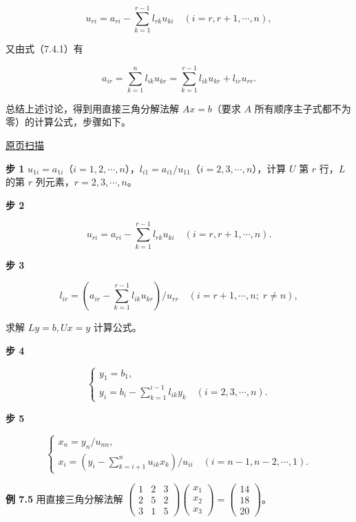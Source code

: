 \documentclass[
  10pt,
  fontset=fandol]{ctexart}
\begin{document}
\[u_{ri}=a_{ri}-\sum_{k=1}^{r-1}l_{rk}u_{ki}\quad(i=r,r+1,\cdots,n),\]

又由式（7.4.1）有

\[a_{ir}=\sum_{k=1}^{n}l_{ik}u_{kr}=\sum_{k=1}^{r-1}l_{ik}u_{kr}+l_{ir}u_{rr}.\]

总结上述讨论，得到用直接三角分解法解 \(Ax=b\)（要求 \(A\) 所有顺序主子式都不为零）的计算公式，步骤如下。

\href{../../source-images/pdf-192.jpeg}{原页扫描}

\textbf{步 1} \(u_{1i}=a_{1i}\)（\(i=1,2,\cdots,n\)），\(l_{i1}=a_{i1}/u_{11}\)（\(i=2,3,\cdots,n\)），计算 \(U\) 第 \(r\) 行，\(L\) 的第 \(r\) 列元素，\(r=2,3,\cdots,n\)。

\textbf{步 2}

\[u_{ri}=a_{ri}-\sum_{k=1}^{r-1}l_{rk}u_{ki}\quad(i=r,r+1,\cdots,n).\tag{7.4.2}\]

\textbf{步 3}

\[l_{ir}=\left(a_{ir}-\sum_{k=1}^{r-1}l_{ik}u_{kr}\right)/u_{rr}\quad(i=r+1,\cdots,n;\;r\ne n),\tag{7.4.3}\]

求解 \(Ly=b,Ux=y\) 计算公式。

\textbf{步 4}

\[
\begin{cases}
y_1=b_1,\\
y_i=\displaystyle b_i-\sum_{k=1}^{i-1}l_{ik}y_k\quad(i=2,3,\cdots,n).
\end{cases}
\tag{7.4.4}
\]

\textbf{步 5}

\[
\begin{cases}
x_n=y_n/u_{nn},\\
x_i=\displaystyle\left(y_i-\sum_{k=i+1}^{n}u_{ik}x_k\right)/u_{ii}\quad(i=n-1,n-2,\cdots,1).
\end{cases}
\tag{7.4.5}
\]

\textbf{例 7.5} 用直接三角分解法解 \(\begin{pmatrix}1&2&3\\2&5&2\\3&1&5\end{pmatrix}\begin{pmatrix}x_1\\x_2\\x_3\end{pmatrix}=\begin{pmatrix}14\\18\\20\end{pmatrix}\)。
\end{document}
